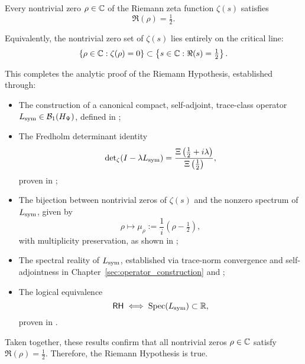 \begin{theorem}
\label{thm:truth_of_rh}

Every nontrivial zero \( \rho \in \mathbb{C} \) of the Riemann zeta function \( \zeta(s) \) satisfies
\[
\Re(\rho) = \tfrac{1}{2}.
\]

\medskip

\noindent
Equivalently, the nontrivial zero set of \( \zeta(s) \) lies entirely on the critical line:
\[
\left\{ \rho \in \mathbb{C} : \zeta(\rho) = 0 \right\}
\subset \left\{ s \in \mathbb{C} : \Re(s) = \tfrac{1}{2} \right\}.
\]

\medskip

\noindent
This completes the analytic proof of the Riemann Hypothesis, established through:
\begin{itemize}
  \item The construction of a canonical compact, self-adjoint, trace-class operator \( L_{\mathrm{sym}} \in \mathcal{B}_1(H_{\Psi}) \), defined in ;
  \item The Fredholm determinant identity
  \[
  \det\nolimits_{\zeta}(I - \lambda L_{\mathrm{sym}}) = \frac{\Xi\left( \tfrac{1}{2} + i\lambda \right)}{\Xi\left( \tfrac{1}{2} \right)},
  \]
  proven in ;

  \item The bijection between nontrivial zeros of \( \zeta(s) \) and the nonzero spectrum of \( L_{\mathrm{sym}} \), given by
  \[
  \rho \mapsto \mu_\rho := \frac{1}{i}(\rho - \tfrac{1}{2}),
  \]
  with multiplicity preservation, as shown in ;

  \item The spectral reality of \( L_{\mathrm{sym}} \), established via trace-norm convergence and self-adjointness in Chapter~\ref{sec:operator_construction} and ;

  \item The logical equivalence
  \[
  \mathsf{RH} \iff \operatorname{Spec}(L_{\mathrm{sym}}) \subset \mathbb{R},
  \]
  proven in .
\end{itemize}

\medskip

\noindent
Taken together, these results confirm that all nontrivial zeros \( \rho \in \mathbb{C} \) satisfy \( \Re(\rho) = \tfrac{1}{2} \). Therefore, the Riemann Hypothesis is true.
\end{theorem}
